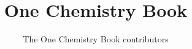 \documentclass[11pt,a4paper,twoside,openany]{book}
\title{One Chemistry Book}
\author{The One Chemistry Book contributors}
\date{\bookdate}
\begin{document}
\frontmatter




\tableofcontents

\mainmatter



\appendix
\part{\omsolutionspart}


\backmatter
\renewcommand{\indexspace}{\par\vskip 8pt plus 4pt minus 4pt\relax}
\printindex
\end{document}
